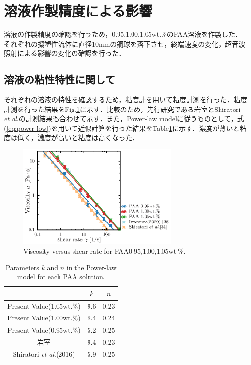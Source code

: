 \section{溶液作製精度による影響}

溶液の作製精度の確認を行うため，0.95,1.00,1.05wt.\%のPAA溶液を作製した．それぞれの擬塑性流体に直径10mmの鋼球を落下させ，終端速度の変化，超音波照射による影響の変化の確認を行った．

\subsection{溶液の粘性特性に関して}
それぞれの溶液の特性を確認するため，粘度計を用いて粘度計測を行った．粘度計測を行った結果をFig.\ref{fig:95-105}に示す．比較のため，先行研究である岩室\cite{ref:8}とShiratori \textit{et al}.\cite{ref:9}の計測結果も合わせて示す．また，Power-law modelに従うものとして，式(\ref{eq:power-low})を用いて近似計算を行った結果をTable\ref{table:005_knParameter}に示す．濃度が薄いと粘度は低く，濃度が高いと粘度は高くなった．

\begin{figure}[H]
    \centering
    \includegraphics[width=0.72\textwidth]{X-Appendix/concentration/viscosity/viscosity.eps}
    \caption{Viscosity versus shear rate for PAA0.95,1.00,1.05wt.\%.}
    \label{fig:95-105}
\end{figure}

\begin{table}[H]
    \centering
    \caption{Parameters $k$ and $n$ in the Power-law model for each PAA solution.}
    \label{table:005_knParameter}
    \begin{tabular}{c|c|c} \hline
                                                     & $k$ & $n$  \\ \hline \hline
        Present Value(1.05wt.\%)                     & 9.6 & 0.23 \\
        Present Value(1.00wt.\%)                     & 8.4 & 0.24 \\
        Present Value(0.95wt.\%)                     & 5.2 & 0.25 \\
        岩室\cite{ref:8}                             & 9.4 & 0.23 \\
        Shiratori \textit{et al}.(2016)\cite{ref:10} & 5.9 & 0.25 \\ \hline
    \end{tabular}
\end{table}

